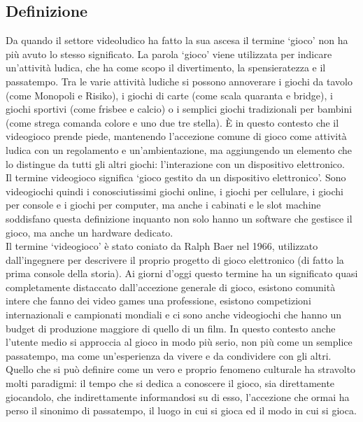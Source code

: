     \subsection{Definizione}\label{subsec:VideogiochiDef}
        Da quando il settore videoludico ha fatto la sua ascesa il termine `gioco' non ha più avuto lo stesso significato. La parola `gioco' viene utilizzata per indicare un'attività 
        ludica, che ha come scopo il divertimento, la spensieratezza e il passatempo. Tra le varie attività ludiche si possono annoverare i giochi da tavolo (come Monopoli e Risiko),
        i giochi di carte (come scala quaranta e bridge), i giochi sportivi (come frisbee e calcio) o i semplici giochi tradizionali per bambini (come strega comanda colore e uno due 
        tre stella). È in questo contesto che il videogioco prende piede, mantenendo l'accezione comune di gioco come attività ludica con un regolamento e un'ambientazione, ma 
        aggiungendo un elemento che lo distingue da tutti gli altri giochi: l'interazione con un dispositivo elettronico. \\
        Il termine videogioco significa `gioco gestito da un dispositivo elettronico'. Sono videogiochi quindi i conosciutissimi giochi online, i giochi per cellulare, i giochi per console 
        e i giochi per computer, ma anche i cabinati e le slot machine soddisfano questa definizione inquanto non solo hanno un software che gestisce il gioco, ma anche un hardware dedicato.\\
        Il termine `videogioco' è stato coniato da Ralph Baer nel 1966, utilizzato dall'ingegnere per descrivere il proprio progetto di gioco elettronico (di fatto la prima console della storia).
        Ai giorni d'oggi questo termine ha un significato quasi completamente distaccato dall'accezione generale di gioco, esistono comunità intere che fanno dei video games una professione,
        esistono competizioni internazionali e campionati mondiali e ci sono anche videogiochi che hanno un budget di produzione maggiore di quello di un film. In questo contesto anche l'utente
        medio si approccia al gioco in modo più serio, non più come un semplice passatempo, ma come un'esperienza da vivere e da condividere con gli altri. Quello che si può definire come
        un vero e proprio fenomeno culturale ha stravolto molti paradigmi: il tempo che si dedica a conoscere il gioco, sia direttamente giocandolo, che indirettamente informandosi su di esso,
        l'accezione che ormai ha perso il sinonimo di passatempo, il luogo in cui si gioca ed il modo in cui si gioca.\\ 


